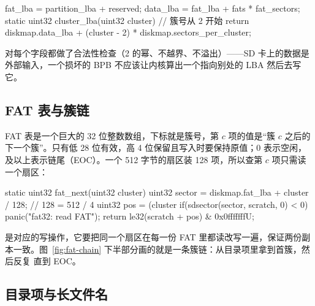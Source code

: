 \begin{ccode}
fat_lba  = partition_lba + reserved;
data_lba = fat_lba + fats * fat_sectors;
static uint32 cluster_lba(uint32 cluster) {     // 簇号从 2 开始
  return diskmap.data_lba + (cluster - 2) * diskmap.sectors_per_cluster;
}
\end{ccode}

 对每个字段都做了合法性检查（2 的幂、不越界、不溢出）——SD 卡上的数据是外部输入，一个损坏的 BPB 不应该让内核算出一个指向别处的 LBA 然后去写它。

\subsection{FAT 表与簇链}

FAT 表是一个巨大的 32 位整数数组，下标就是簇号，第 $c$ 项的值是“簇 $c$ 之后的下一个簇”。只有低 28 位有效，高 4 位保留且写入时要保持原值；0 表示空闲， 及以上表示链尾（EOC）。一个 512 字节的扇区装 128 项，所以查第 $c$ 项只需读一个扇区：

\begin{ccode}
static uint32 fat_next(uint32 cluster) {
  uint32 sector = diskmap.fat_lba + cluster / 128;   // 128 = 512 / 4
  uint32 pos    = (cluster %
  if(sdsector(sector, scratch, 0) < 0) panic("fat32: read FAT");
  return le32(scratch + pos) & 0x0fffffffU;
}
\end{ccode}

 是对应的写操作，它要把同一个扇区在每一份 FAT 里都读改写一遍，保证两份副本一致。图~\ref{fig:fat-chain} 下半部分画的就是一条簇链：从目录项里拿到首簇，然后反复  直到 EOC。

\subsection{目录项与长文件名}

